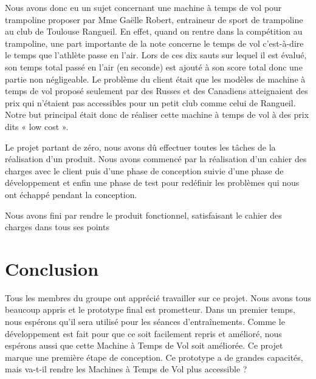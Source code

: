 \documentclass[french]{article}
\begin{document}
Nous avons donc eu un sujet concernant une machine à temps de vol pour trampoline proposer par Mme Gaëlle Robert, entraineur de sport de trampoline au club de Toulouse Rangueil. En effet, quand on rentre dans la compétition au trampoline, une part importante de la note concerne le temps de vol c’est-à-dire le temps que l’athlète passe en l’air. Lors de ces dix sauts sur lequel il est évalué, son temps total passé en l’air (en seconde) est ajouté à son score total donc une partie non négligeable. Le problème du client était que les modèles de machine à temps de vol proposé seulement par des Russes et des Canadiens atteignaient des prix qui n’étaient pas accessibles pour un petit club comme celui de Rangueil. Notre but principal était donc de réaliser cette machine à temps de vol à des prix dits « low cost ». 


Le projet partant de zéro, nous avons dû effectuer toutes les tâches de la réalisation d’un produit. Nous avons commencé par la réalisation d’un cahier des charges avec le client puis d’une phase de conception suivie d’une phase de développement et enfin une phase de test pour redéfinir les problèmes qui nous ont échappé pendant la conception.


Nous avons fini par rendre le produit fonctionnel, satisfaisant le cahier des charges dans tous ses points
\newpage

\tableofcontents
\newpage


\newpage


\newpage


\newpage


\newpage


\newpage


\newpage

\section*{Conclusion}
Tous les membres du groupe ont apprécié travailler sur ce projet. Nous avons tous beaucoup appris et le prototype final est prometteur. Dans un premier temps, nous espérons qu'il sera utilisé pour les séances d'entraînements. Comme le développement est fait pour que ce soit facilement repris et amélioré, nous espérons aussi que cette Machine à Temps de Vol soit améliorée. Ce projet marque une première étape de conception. Ce prototype a de grandes capacités, mais  va-t-il rendre les Machines à Temps de Vol plus accessible ?
\newpage
\end{document}
